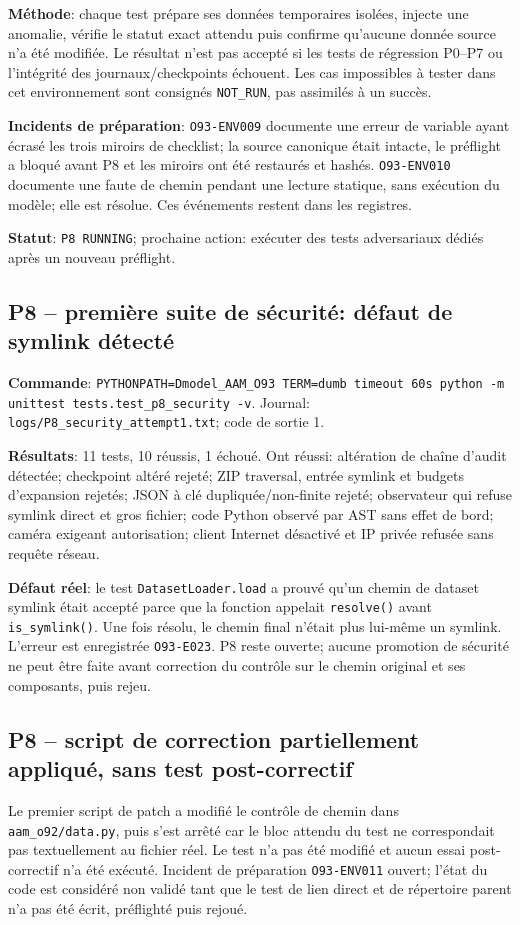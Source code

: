 \documentclass[11pt,a4paper,oneside]{report}
\begin{document}
\textbf{Méthode}: chaque test prépare ses données temporaires isolées, injecte une anomalie, vérifie le statut exact attendu puis confirme qu’aucune donnée source n’a été modifiée. Le résultat n’est pas accepté si les tests de régression P0--P7 ou l’intégrité des journaux/checkpoints échouent. Les cas impossibles à tester dans cet environnement sont consignés \texttt{NOT\_RUN}, pas assimilés à un succès.

\textbf{Incidents de préparation}: \texttt{O93-ENV009} documente une erreur de variable ayant écrasé les trois miroirs de checklist; la source canonique était intacte, le préflight a bloqué avant P8 et les miroirs ont été restaurés et hashés. \texttt{O93-ENV010} documente une faute de chemin pendant une lecture statique, sans exécution du modèle; elle est résolue. Ces événements restent dans les registres.

\textbf{Statut}: \texttt{P8 RUNNING}; prochaine action: exécuter des tests adversariaux dédiés après un nouveau préflight.


\subsection{P8 -- première suite de sécurité: défaut de symlink détecté}
\textbf{Commande}: \texttt{PYTHONPATH=Dmodel\_AAM\_O93 TERM=dumb timeout 60s python -m unittest tests.test\_p8\_security -v}. Journal: \texttt{logs/P8\_security\_attempt1.txt}; code de sortie 1.

\textbf{Résultats}: 11 tests, 10 réussis, 1 échoué. Ont réussi: altération de chaîne d’audit détectée; checkpoint altéré rejeté; ZIP traversal, entrée symlink et budgets d’expansion rejetés; JSON à clé dupliquée/non-finite rejeté; observateur qui refuse symlink direct et gros fichier; code Python observé par AST sans effet de bord; caméra exigeant autorisation; client Internet désactivé et IP privée refusée sans requête réseau.

\textbf{Défaut réel}: le test \texttt{DatasetLoader.load} a prouvé qu’un chemin de dataset symlink était accepté parce que la fonction appelait \texttt{resolve()} avant \texttt{is\_symlink()}. Une fois résolu, le chemin final n’était plus lui-même un symlink. L’erreur est enregistrée \texttt{O93-E023}. P8 reste ouverte; aucune promotion de sécurité ne peut être faite avant correction du contrôle sur le chemin original et ses composants, puis rejeu.


\subsection{P8 -- script de correction partiellement appliqué, sans test post-correctif}
Le premier script de patch a modifié le contrôle de chemin dans \texttt{aam\_o92/data.py}, puis s’est arrêté car le bloc attendu du test ne correspondait pas textuellement au fichier réel. Le test n’a pas été modifié et aucun essai post-correctif n’a été exécuté. Incident de préparation \texttt{O93-ENV011} ouvert; l’état du code est considéré non validé tant que le test de lien direct et de répertoire parent n’a pas été écrit, préflighté puis rejoué.
\end{document}
